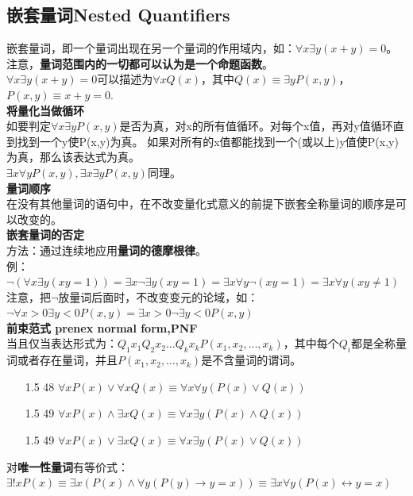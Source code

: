 \documentclass{article}
\begin{document}
    \subsection{嵌套量词Nested Quantifiers}
    嵌套量词，即一个量词出现在另一个量词的作用域内，如：$\forall x \exists y(x+y)=0$。注意，\textbf{量词范围内的一切都可以认为是一个命题函数}。
    \\
    $\forall x \exists y(x+y)=0$可以描述为$\forall xQ(x)$，其中$Q(x) \equiv \exists yP(x,y)$，$P(x,y) \equiv x+y=0$.
    \\
    \textbf{将量化当做循环} \\
    如要判定$\forall x \exists y P(x,y)$是否为真，对x的所有值循环。对每个x值，再对y值循环直到找到一个y使P(x,y)为真。
    如果对所有的x值都能找到一个(或以上)y值使P(x,y)为真，那么该表达式为真。\\
    $\exists x \forall yP(x,y), \exists x \exists yP(x,y)$同理。\\
    \textbf{量词顺序}\\
    在没有其他量词的语句中，在不改变量化式意义的前提下嵌套全称量词的顺序是可以改变的。\\
    \textbf{嵌套量词的否定}\\
    方法：通过连续地应用\textbf{量词的德摩根律}。\\
    例：
    $\neg (\forall x \exists y(xy=1)) = \exists x \neg \exists y(xy=1) = \exists x \forall y \neg(xy=1)
    = \exists x \forall y (xy \neq 1)
    $ \\
    注意，把$\neg$放量词后面时，不改变变元的论域，如：$\neg \forall x>0 \exists y<0 P(x,y) = \exists x>0 \neg \exists y<0 P(x,y)$
    \\
    \textbf{前束范式 prenex normal form,PNF}\\
    当且仅当表达形式为：$Q_1 x_1 Q_2 x_2 \dots Q_k x_k P(x_1,x_2,\dots,x_k)$，其中每个$Q_i$都是全称量词或者存在量词，并且$P(x_1,x_2,\dots,x_k)$是不含量词的谓词。
    \begin{itemize}
        \item[1.5 48] $\forall xP(x)\vee \forall xQ(x) \equiv \forall x \forall y(P(x)\vee Q(x))$
        \item[1.5 49] $\forall xP(x) \wedge \exists xQ(x) \equiv \forall x \exists y(P(x)\wedge Q(x))$
        \item[1.5 49] $\forall xP(x) \vee \exists xQ(x) \equiv \forall x \exists y(P(x)\vee Q(x))$
    \end{itemize}
    对\textbf{唯一性量词}有等价式：$\exists !xP(x) \equiv \exists x(P(x)\wedge \forall y(P(y)\rightarrow y=x)) \equiv \exists x \forall y (P(x)\leftrightarrow y=x)$
\end{document}
